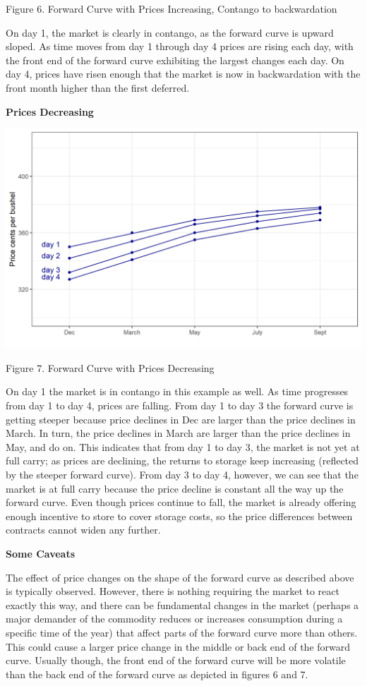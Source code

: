 \documentclass[
]{book}
\begin{document}
Figure 6. Forward Curve with Prices Increasing, Contango to backwardation

On day 1, the market is clearly in contango, as the forward curve is upward sloped. As time moves from day 1 through day 4 prices are rising each day, with the front end of the forward curve exhibiting the largest changes each day. On day 4, prices have risen enough that the market is now in backwardation with the front month higher than the first deferred.

\textbf{Prices Decreasing}

\includegraphics{assets/PricesSpaceTime-pricesdecreasing-hyp.png}

Figure 7. Forward Curve with Prices Decreasing

On day 1 the market is in contango in this example as well. As time progresses from day 1 to day 4, prices are falling. From day 1 to day 3 the forward curve is getting steeper because price declines in Dec are larger than the price declines in March. In turn, the price declines in March are larger than the price declines in May, and do on. This indicates that from day 1 to day 3, the market is not yet at full carry; as prices are declining, the returns to storage keep increasing (reflected by the steeper forward curve). From day 3 to day 4, however, we can see that the market is at full carry because the price decline is constant all the way up the forward curve. Even though prices continue to fall, the market is already offering enough incentive to store to cover storage costs, so the price differences between contracts cannot widen any further.

\textbf{Some Caveats}

The effect of price changes on the shape of the forward curve as described above is typically observed. However, there is nothing requiring the market to react exactly this way, and there can be fundamental changes in the market (perhaps a major demander of the commodity reduces or increases consumption during a specific time of the year) that affect parts of the forward curve more than others. This could cause a larger price change in the middle or back end of the forward curve. Usually though, the front end of the forward curve will be more volatile than the back end of the forward curve as depicted in figures 6 and 7.
\end{document}
